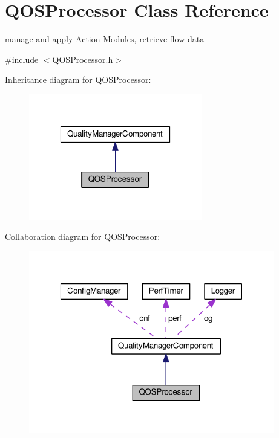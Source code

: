\hypertarget{classQOSProcessor}{}\section{Q\+O\+S\+Processor Class Reference}
\label{classQOSProcessor}


manage and apply Action Modules, retrieve flow data  




{\ttfamily \#include $<$Q\+O\+S\+Processor.\+h$>$}



Inheritance diagram for Q\+O\+S\+Processor\+:
\nopagebreak
\begin{figure}[H]
\begin{center}
\leavevmode
\includegraphics[width=214pt]{classQOSProcessor__inherit__graph}
\end{center}
\end{figure}


Collaboration diagram for Q\+O\+S\+Processor\+:
\nopagebreak
\begin{figure}[H]
\begin{center}
\leavevmode
\includegraphics[width=304pt]{classQOSProcessor__coll__graph}
\end{center}
\end{figure}

